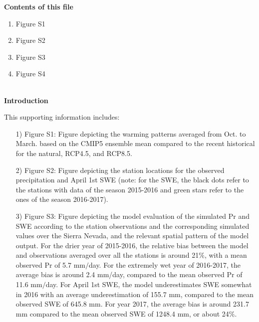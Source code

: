 \documentclass[grl]{agutexSI}
\begin{document}
\begin{article}

%
%



\noindent\textbf{Contents of this file}
\begin{enumerate}
\item Figure S1
\item Figure S2
\item Figure S3
\item Figure S4
\end{enumerate}
\ \\

\noindent\textbf{Introduction}


This supporting information includes:

\begin{itemize}

\item[1)]  Figure S1: Figure depicting the warming patterns averaged from Oct. to March. based on the CMIP5 ensemble mean compared to the recent historical for the natural, RCP4.5, and RCP8.5.


\item[2)]  Figure S2: Figure depicting the station locations for the observed precipitation and April 1st SWE (note: for the SWE, the black dots refer to the stations with data of the season 2015-2016 and green stars refer to the ones of the season 2016-2017).

\item[3)]  Figure S3: Figure depicting the model evaluation of the simulated Pr and SWE according to the station observations and the corresponding simulated values over the Sierra Nevada, and the relevant spatial pattern of the model output. For the drier year of 2015-2016, the relative bias between the model and observations averaged over all the stations is around 21$\%$, with a mean observed Pr of 5.7 mm$/$day. For the extremely wet year of 2016-2017, the average bias is around 2.4 mm/day, compared to the mean observed Pr of 11.6 mm$/$day. For April 1st SWE, the model underestimates SWE somewhat in 2016 with an average underestimation of 155.7 mm, compared to the mean observed SWE of 645.8 mm. For year 2017, the average bias is around 231.7 mm compared to the mean observed SWE of 1248.4 mm, or about 24$\%$.


\end{itemize}
\end{article}
\end{document}
